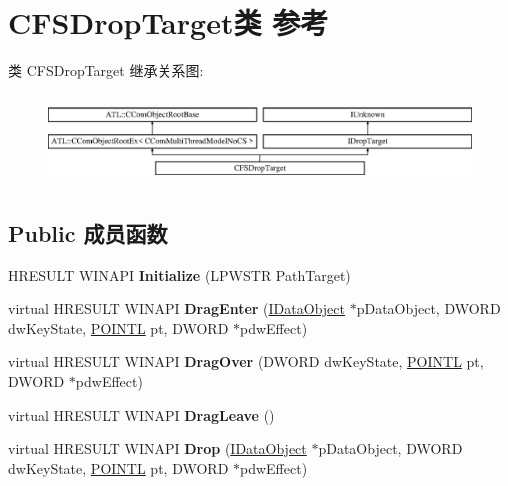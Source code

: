 \hypertarget{class_c_f_s_drop_target}{}\section{C\+F\+S\+Drop\+Target类 参考}
\label{class_c_f_s_drop_target}
类 C\+F\+S\+Drop\+Target 继承关系图\+:\begin{figure}[H]
\begin{center}
\leavevmode
\includegraphics[height=2.386364cm]{class_c_f_s_drop_target}
\end{center}
\end{figure}
\subsection*{Public 成员函数}
\begin{DoxyCompactItemize}
\item 
\mbox{\label{class_c_f_s_drop_target_a09176b8b3ad1af727b3cee1cbed16a30}} 
H\+R\+E\+S\+U\+LT W\+I\+N\+A\+PI {\bfseries Initialize} (L\+P\+W\+S\+TR Path\+Target)
\item 
\mbox{\label{class_c_f_s_drop_target_a0aea9409459aa53ea9a7712b80f2c737}} 
virtual H\+R\+E\+S\+U\+LT W\+I\+N\+A\+PI {\bfseries Drag\+Enter} (\hyperlink{interface_i_data_object}{I\+Data\+Object} $\ast$p\+Data\+Object, D\+W\+O\+RD dw\+Key\+State, \hyperlink{struct___p_o_i_n_t_l}{P\+O\+I\+N\+TL} pt, D\+W\+O\+RD $\ast$pdw\+Effect)
\item 
\mbox{\label{class_c_f_s_drop_target_a427ff7816cbd56f65dcb0b2c11f552ef}} 
virtual H\+R\+E\+S\+U\+LT W\+I\+N\+A\+PI {\bfseries Drag\+Over} (D\+W\+O\+RD dw\+Key\+State, \hyperlink{struct___p_o_i_n_t_l}{P\+O\+I\+N\+TL} pt, D\+W\+O\+RD $\ast$pdw\+Effect)
\item 
\mbox{\label{class_c_f_s_drop_target_a72abf9e524ee0d80a4e8dc6b93039210}} 
virtual H\+R\+E\+S\+U\+LT W\+I\+N\+A\+PI {\bfseries Drag\+Leave} ()
\item 
\mbox{\label{class_c_f_s_drop_target_ade7a585806659cf5ddbbb9682b53e795}} 
virtual H\+R\+E\+S\+U\+LT W\+I\+N\+A\+PI {\bfseries Drop} (\hyperlink{interface_i_data_object}{I\+Data\+Object} $\ast$p\+Data\+Object, D\+W\+O\+RD dw\+Key\+State, \hyperlink{struct___p_o_i_n_t_l}{P\+O\+I\+N\+TL} pt, D\+W\+O\+RD $\ast$pdw\+Effect)
\end{DoxyCompactItemize}
